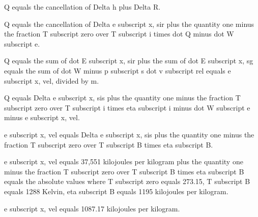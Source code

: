 Q equals the cancellation of Delta h plus Delta R.

Q equals the cancellation of Delta e subscript x, sir plus the quantity one minus the fraction T subscript zero over T subscript i times dot Q minus dot W subscript e.

Q equals the sum of dot E subscript x, sir plus the sum of dot E subscript x, sg equals the sum of dot W minus p subscript s dot v subscript rel equals e subscript x, vel, divided by m.

Q equals Delta e subscript x, sis plus the quantity one minus the fraction T subscript zero over T subscript i times eta subscript i minus dot W subscript e minus e subscript x, vel.

e subscript x, vel equals Delta e subscript x, sis plus the quantity one minus the fraction T subscript zero over T subscript B times eta subscript B.

e subscript x, vel equals 37,551 kilojoules per kilogram plus the quantity one minus the fraction T subscript zero over T subscript B times eta subscript B equals the absolute values where T subscript zero equals 273.15, T subscript B equals 1288 Kelvin, eta subscript B equals 1195 kilojoules per kilogram.

e subscript x, vel equals 1087.17 kilojoules per kilogram.